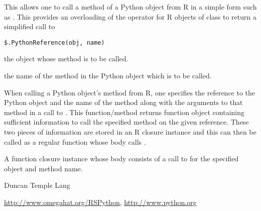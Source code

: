 \begin{Description}\relax
This allows one to call a method of a Python object
from R in a simple form such as .
This provides an overloading of the \code{\$} operator
for R objects of class  to return
a simplified call to \end{Description}
\begin{Usage}
\begin{verbatim}
$.PythonReference(obj, name)
\end{verbatim}
\end{Usage}
\begin{Arguments}
\begin{ldescription}
\item[\code{obj}] the  object whose method is to be called.
\item[\code{name}] the name of the method in the Python object which is to be called.
\end{ldescription}
\end{Arguments}
\begin{Details}\relax
When calling a Python object's method from R, one specifies the
reference to the Python object and the name of the method along with
the arguments to that method in a call to . 
This function/method returns  function object containing sufficient
information to call the specified method on the given reference.
These two pieces of information are stored in an R closure instance
and this can then be called as a regular function whose
body calls .\end{Details}
\begin{Value}
A function closure instance whose body consists
of a call to  for the 
specified  object
and method name.\end{Value}
\begin{Author}\relax
Duncan Temple Lang\end{Author}
\begin{References}\relax
\url{http://www.omegahat.org/RSPython},
\url{http://www.python.org}\end{References}
\begin{SeeAlso}\relax
{}
\end{SeeAlso}
\begin{Examples}
\end{Examples}

